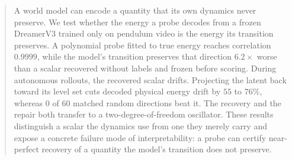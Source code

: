 \begin{abstract}
A world model can encode a quantity that its own dynamics never preserve. We test whether the energy
a probe decodes from a frozen DreamerV3 trained only on pendulum video is the energy its transition
preserves. A polynomial probe fitted to true energy reaches correlation $0.9999$, while the model's
transition preserves that direction $6.2\times$ worse than a scalar recovered without labels and
frozen before scoring. During autonomous rollouts, the recovered scalar drifts. Projecting the latent
back toward its level set cuts decoded physical energy drift by $55$ to $76\%$, whereas 0 of 60
matched random directions beat it. The recovery and the repair both transfer to a
two-degree-of-freedom oscillator. These results distinguish a scalar the dynamics use from one they
merely carry and expose a concrete failure mode of interpretability: a probe can certify
near-perfect recovery of a quantity the model's transition does not preserve.
\end{abstract}
